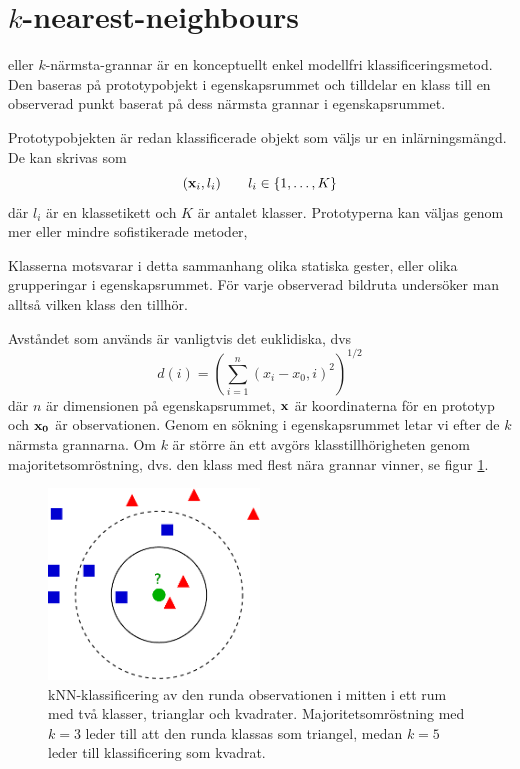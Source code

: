 \documentclass[../rapport_MVEX01-11-05]{subfiles}
\begin{document}
\section{$k$-nearest-neighbours}\label{sec:knn}

\knn eller $k$-närmsta-grannar är en konceptuellt enkel modellfri
klassificeringsmetod.
Den baseras på prototypobjekt i egenskapsrummet och tilldelar en klass
till en observerad punkt baserat på dess närmsta grannar i egenskapsrummet.

Prototypobjekten är redan klassificerade objekt som väljs ur en inlärningsmängd.
De kan skrivas som
\begin{equation*}
    (\mathbf{x}_i, l_i)\qquad l_i \in \{ 1,\dotsc,K \}
\end{equation*}
där $l_i$ är en klassetikett och $K$ är antalet klasser.
Prototyperna kan väljas genom mer eller mindre sofistikerade metoder,


Klasserna motsvarar i detta sammanhang olika statiska gester,
eller olika grupperingar i egenskapsrummet. För
varje observerad bildruta undersöker man alltså vilken klass den tillhör.

Avståndet som används är vanligtvis det euklidiska, dvs
\begin{equation*}
    d(i) = \left(\sum_{i=1}^n(x_i-x_0,i)^2\right)^{1/2}
\end{equation*}
där $n$ är dimensionen på egenskapsrummet, $\mathbf{x}$ är koordinaterna för en
prototyp och $\mathbf{x_0}$ är observationen. Genom en sökning i
egenskapsrummet letar vi efter de $k$ närmsta grannarna. Om $k$ är större än ett
avgörs klasstillhörigheten genom majoritetsomröstning, dvs. den klass med flest
nära grannar vinner, se figur \ref{fig:knn-overview}.

\begin{figure}[!htb]
    \begin{center}
\includegraphics[width=0.5\textwidth]{bilder/KnnClassification}
    \end{center}
    \caption{kNN-klassificering av den runda observationen i mitten i ett rum
    med två klasser, trianglar och kvadrater. Majoritetsomröstning
    med $k=3$ leder till att den runda klassas som triangel, medan $k=5$ leder
    till klassificering som kvadrat.}
    \label{fig:knn-overview}
\end{figure}
\end{document}
